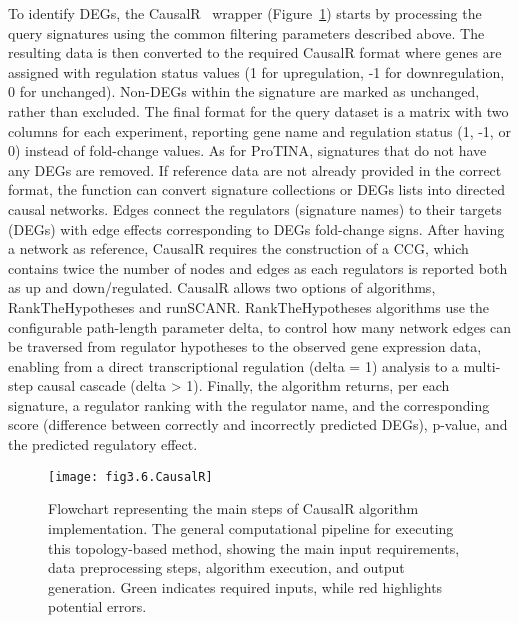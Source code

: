 To identify \gls{DEGs}, the CausalR~\cite{RN32} wrapper (Figure~\ref{fig:fig3.6.CausalR}) starts by processing the query signatures using the common filtering parameters described above.
The resulting data is then converted to the required CausalR format where genes are assigned with regulation status values (1 for upregulation, -1 for downregulation, 0 for unchanged).
Non-\gls{DEGs} within the signature are marked as unchanged, rather than excluded. The final format for the query dataset is a matrix with two columns for each experiment, reporting gene name and regulation status (1, -1, or 0) instead of fold-change values.
As for \gls{ProTINA}, signatures that do not have any \gls{DEGs} are removed. If reference data are not already provided in the correct format, the function can convert signature collections or \gls{DEGs} lists into directed causal networks.
Edges connect the regulators (signature names) to their targets (\gls{DEGs}) with edge effects corresponding to \gls{DEGs} fold-change signs. 
After having a network as reference, CausalR requires the construction of a \gls{CCG}, which contains twice the number of nodes and edges as each regulators is reported both as up and down/regulated.
CausalR allows two options of algorithms, RankTheHypotheses and runSCANR.
RankTheHypotheses algorithms use the configurable path-length parameter delta, to control how many network edges can be traversed from regulator hypotheses to the observed gene expression data, enabling from a direct transcriptional regulation (delta = 1) analysis to a multi-step causal cascade (delta > 1).
Finally, the algorithm returns, per each signature, a regulator ranking with the regulator name, and the corresponding score (difference between correctly and incorrectly predicted \gls{DEGs}), p-value, and the predicted regulatory effect.

\begin{figure}[htbp]
    \centering
    \texttt{[image: fig3.6.CausalR]}
    \caption[Flowchart representing the main steps of CausalR algorithm implementation.]{Flowchart representing the main steps of CausalR algorithm implementation. The general computational pipeline for executing this topology-based method, showing the main input requirements, data preprocessing steps, algorithm execution, and output generation. Green indicates required inputs, while red highlights potential errors.}
    \label{fig:fig3.6.CausalR}
\end{figure}

